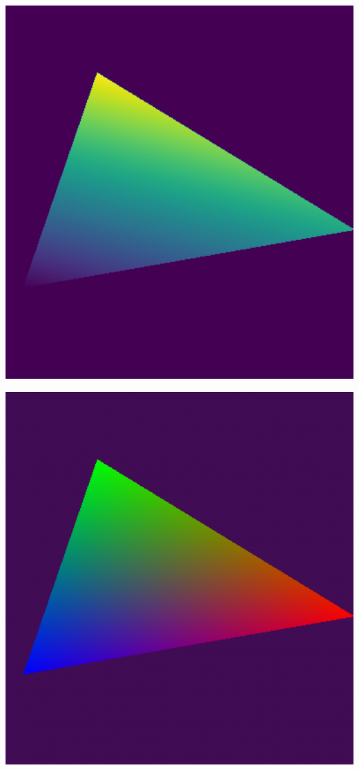 \documentclass{article}
\begin{document}
\begin{center}
    \begin{minipage}{0.45\textwidth}
        \includegraphics*[width=\linewidth]{../images/depth_test.png}
    \end{minipage}
    \hfill
    \begin{minipage}{0.45\textwidth}
        \includegraphics*[width=\linewidth]{../images/bary_test.png}
    \end{minipage}
\end{center}
\end{document}
